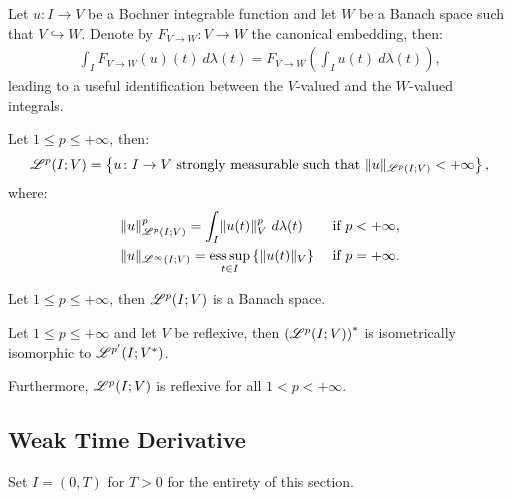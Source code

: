 \begin{remark}[Embedding]
    Let $u\colon I \rightarrow V$ be a Bochner integrable function and let $W$ be a Banach space such that $V \hookrightarrow W$. Denote by $F_{V \rightarrow W} \colon V \rightarrow W$ the canonical embedding, then:
    \begin{align}
        \int_I F_{V \rightarrow W}(u)(t) ~ d \lambda(t) = F_{V \rightarrow W}\left( \int_I u(t) ~ d \lambda(t) \right),
    \end{align}
    leading to a useful identification between the $V$-valued and the $W$-valued integrals.
\end{remark}

\begin{definition}[$\SpaceLp{p}(I; V)$]
    Let $1 \leq p \leq +\infty$, then:
    \begin{align}
        \mathscr{L}^{p}(I; V) = \left\{ u \colon I \rightarrow V \text{ strongly measurable such that } \lVert u \rVert_{\mathscr{L}^{p}(I; V)} < +\infty \right\},
    \end{align}
    where:
    \begin{align}
        & \lVert u \rVert_{\mathscr{L}^{p}(I; V)}^p = \int_I \lVert u(t) \rVert_V^p ~ d \lambda(t) & \text{ if } p < +\infty, \\
        & \lVert u \rVert_{\mathscr{L}^{\infty}(I; V)} = \operatorname*{ess\,sup}_{t \in I} \left\{ \lVert u(t) \rVert_V \right\} & \text{ if } p = +\infty.
    \end{align}
\end{definition}

\begin{theorem}
    Let $1 \leq p \leq +\infty$, then $\SpaceLp{p}(I; V)$ is a Banach space.
\end{theorem}

\begin{theorem} %
    Let $1 \leq p \leq +\infty$ and let $V$ be reflexive, then $\left( \mathscr{L}^{p}(I; V) \right)^*$ is isometrically isomorphic to $\mathscr{L}^{p^{\prime}}(I; V^*)$.

    Furthermore, $\SpaceLp{p}(I; V)$ is reflexive for all $1 < p < +\infty$.
\end{theorem}

\newpage
\subsection{Weak Time Derivative}

Set $I = (0, T)$ for $T > 0$ for the entirety of this section.

